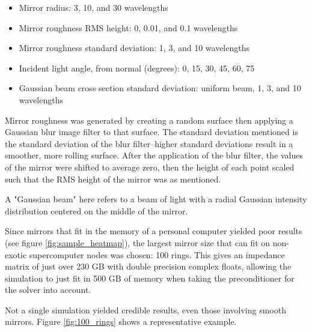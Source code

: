 \documentclass[etd,senior,noacknowledgments]{BYUPhys}
\begin{document}
\begin{itemize}
  \item Mirror radius: 3, 10, and 30 wavelengths
  \item Mirror roughness RMS height: 0, 0.01, and 0.1 wavelengths
  \item Mirror roughness standard deviation: 1, 3, and 10 wavelengths
  \item Incident light angle, from normal (degrees): 0, 15, 30, 45, 60, 75
  \item Gaussian beam cross section standard deviation: uniform beam, 1, 3, and 10 wavelengths
\end{itemize}

Mirror roughness was generated by creating a random surface then applying a Gaussian blur image filter to that surface. The standard deviation mentioned is the standard deviation of the blur filter--higher standard deviations result in a smoother, more rolling surface. After the application of the blur filter, the values of the mirror were shifted to average zero, then the height of each point scaled such that the RMS height of the mirror was as mentioned.

A "Gaussian beam" here refers to a beam of light with a radial Gaussian intensity distribution centered on the middle of the mirror.

Since mirrors that fit in the memory of a personal computer yielded poor results (see figure \ref{fig:sample_heatmap}), the largest mirror size that can fit on non-exotic supercomputer nodes was chosen: 100 rings. This gives an impedance matrix of just over 230 GB with double precision complex floats, allowing the simulation to just fit in 500 GB of memory when taking the preconditioner for the solver into account.

Not a single simulation yielded credible results, even those involving smooth mirrors. Figure \ref{fig:100_rings} shows a representative example.
\end{document}
